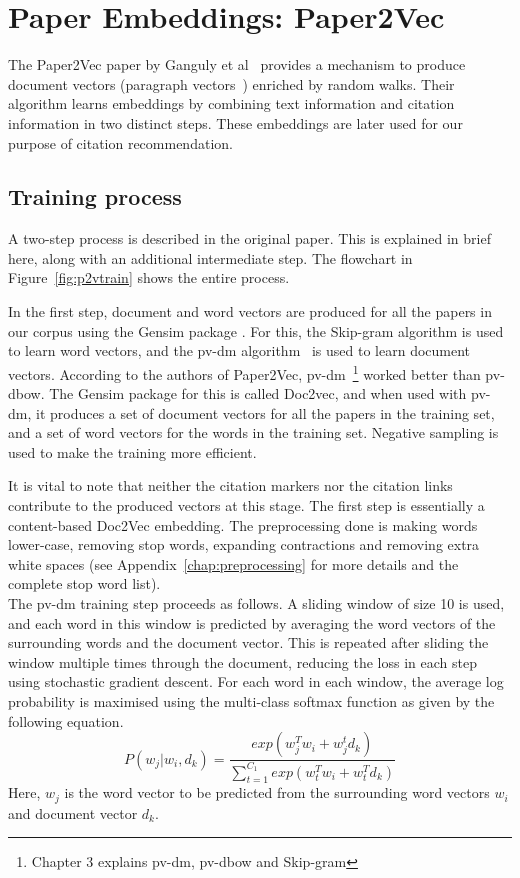 \section{Paper Embeddings: Paper2Vec}
The Paper2Vec paper by Ganguly et al~\cite{GangulyP17} provides a mechanism to produce document vectors (paragraph vectors~\cite{LeM14}) enriched by random walks. Their algorithm learns embeddings by combining text information and citation information in two distinct steps. These embeddings are later used for our purpose of citation recommendation. 
\subsection{Training process}
A two-step process is described in the original paper. This is explained in brief here, along with an additional intermediate step. The flowchart in Figure~\ref{fig:p2vtrain} shows the entire process. 

In the first step, document and word vectors are produced for all the papers in our corpus using the Gensim package \cite{rehureklrec}. 
For this, the Skip-gram algorithm is used to learn word vectors, and the pv-dm algorithm~\cite{LeM14} is used to learn document vectors. According to the authors of Paper2Vec, pv-dm~\footnote{Chapter 3 explains pv-dm, pv-dbow and Skip-gram} worked better than pv-dbow. The Gensim package for this is called Doc2vec, and when used with pv-dm, it produces a set of document vectors for all the papers in the training set, and a set of word vectors for the words in the training set. Negative sampling is used to make the training more efficient. 

It is vital to note that neither the citation markers nor the citation links contribute to the produced vectors at this stage. The first step is essentially a content-based Doc2Vec embedding. The preprocessing done is making words lower-case, removing stop words, expanding contractions and removing extra white spaces (see Appendix~\ref{chap:preprocessing} for more details and the complete stop word list).
\\
The pv-dm training step proceeds as follows. A sliding window of size 10 is used, and each word in this window is predicted by averaging the word vectors of the surrounding words and the document vector. This is repeated after sliding the window multiple times through the document, reducing the loss in each step using stochastic gradient descent. For each word in each window, the average log probability is maximised using the multi-class softmax function as given by the following equation.
\begin{equation}
    P(w_j|{w_i, d_k}) = \frac{exp(w_j^Tw_i + w_j^td_k)}{\sum_{t=1}^{C_1}{exp(w_t^Tw_i + w_t^Td_k)}}
\end{equation}
Here, $w_j$ is the word vector to be predicted from the surrounding word vectors $w_i$ and document vector $d_k$.

